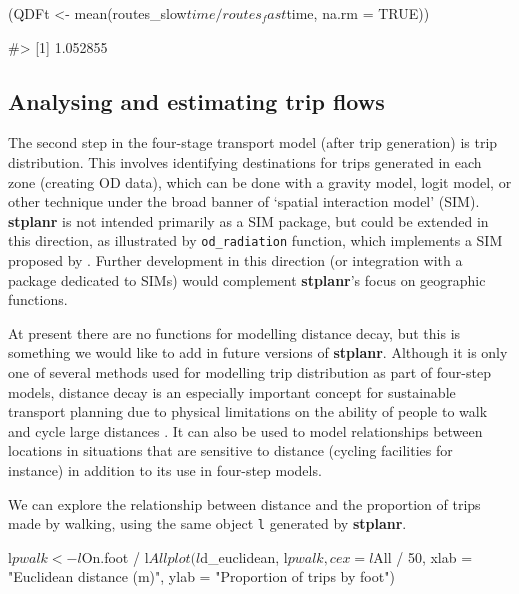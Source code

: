 \begin{Schunk}
\begin{Sinput}
(QDFt <- mean(routes_slow$time / routes_fast$time, na.rm = TRUE))
\end{Sinput}
\begin{Soutput}
#> [1] 1.052855
\end{Soutput}
\end{Schunk}

\subsection{Analysing and estimating trip flows}\label{models-of-travel-behaviour}

The second step in the four-stage transport model (after trip generation) is trip distribution.
This involves identifying destinations for trips generated in each zone (creating OD data), which can be done with a gravity model, logit model, or other technique under the broad banner of `spatial interaction model' (SIM).
\textbf{stplanr} is not intended primarily as a SIM package, but could be extended in this direction, as illustrated by \texttt{od\_radiation} function, which implements a SIM proposed by \citet{simini_universal_2012}.
Further development in this direction (or integration with a package dedicated to SIMs) would complement \textbf{stplanr}'s focus on geographic functions.

At present there are no functions for modelling distance decay, but this
is something we would like to add in future versions of
\textbf{stplanr}.
Although it is only one of several methods used for modelling trip distribution as part of four-step models,
distance decay is an especially important concept for
sustainable transport planning due to physical limitations on the
ability of people to walk and cycle large distances
\citep{iacono_measuring_2010}.
It can also be used to model relationships between locations in situations that are sensitive to distance (cycling facilities for instance) in addition to its use in four-step models.

We can explore the relationship between distance and the proportion of
trips made by walking, using the same object \texttt{l} generated by
\textbf{stplanr}.

\begin{Schunk}
\begin{Sinput}
l$pwalk <- l$On.foot / l$All
plot(l$d_euclidean, l$pwalk, cex = l$All / 50,
  xlab = "Euclidean distance (m)", ylab = "Proportion of trips by foot")
\end{Sinput}
\end{Schunk}

